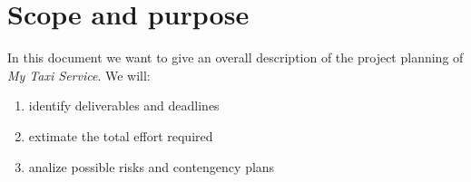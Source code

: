 \section {Scope and purpose}
In this document we want to give an overall description of the project planning of \textit{My Taxi Service}.
We will:
\begin {enumerate}
\item identify deliverables and deadlines
\item extimate the total effort required
\item analize possible risks and contengency plans
\end {enumerate}